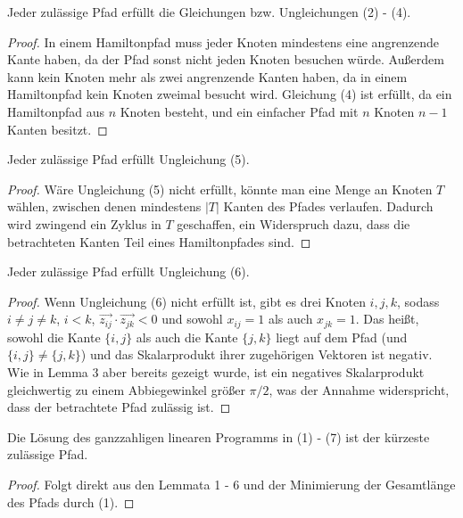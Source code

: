 \documentclass[a4paper, 10pt, ngerman]{article}
\begin{document}
\begin{lemma}
    Jeder zulässige Pfad erfüllt die Gleichungen bzw. Ungleichungen (2) - (4).
\end{lemma}

\begin{proof}
    In einem Hamiltonpfad muss jeder Knoten mindestens eine angrenzende Kante haben, da der Pfad sonst nicht jeden Knoten besuchen würde. Außerdem kann kein Knoten mehr als zwei angrenzende Kanten haben, da in einem Hamiltonpfad kein Knoten zweimal besucht wird. Gleichung (4) ist erfüllt, da ein Hamiltonpfad aus $n$ Knoten besteht, und ein einfacher Pfad mit $n$ Knoten $n - 1$ Kanten besitzt.
\end{proof}

\begin{lemma}
    Jeder zulässige Pfad erfüllt Ungleichung (5).
\end{lemma}

\begin{proof}
    Wäre Ungleichung (5) nicht erfüllt, könnte man eine Menge an Knoten $T$ wählen, zwischen denen mindestens $|T|$ Kanten des Pfades verlaufen. Dadurch wird zwingend ein Zyklus in $T$ geschaffen, ein Widerspruch dazu, dass die betrachteten Kanten Teil eines Hamiltonpfades sind.
\end{proof}

\begin{lemma}
    Jeder zulässige Pfad erfüllt Ungleichung (6).
\end{lemma}

\begin{proof}
    Wenn Ungleichung (6) nicht erfüllt ist, gibt es drei Knoten $i, j, k$, sodass $i \ne j \ne k$, $i < k$, $\vec{z_{ij}} \cdot \vec{z_{jk}} < 0$ und sowohl $x_{ij} = 1$ als auch $x_{jk} = 1$. Das heißt, sowohl die Kante $\{i, j\}$ als auch die Kante $\{j, k\}$ liegt auf dem Pfad (und $\{i, j\} \ne \{j, k\}$) und das Skalarprodukt ihrer zugehörigen Vektoren ist negativ. Wie in Lemma 3 aber bereits gezeigt wurde, ist ein negatives Skalarprodukt gleichwertig zu einem Abbiegewinkel größer $\pi / 2$, was der Annahme widerspricht, dass der betrachtete Pfad zulässig ist.
\end{proof}

\begin{theorem}
    Die Lösung des ganzzahligen linearen Programms in (1) - (7) ist der kürzeste zulässige Pfad. 
\end{theorem}

\begin{proof}
    Folgt direkt aus den Lemmata 1 - 6 und der Minimierung der Gesamtlänge des Pfads durch (1).
\end{proof}
\end{document}
